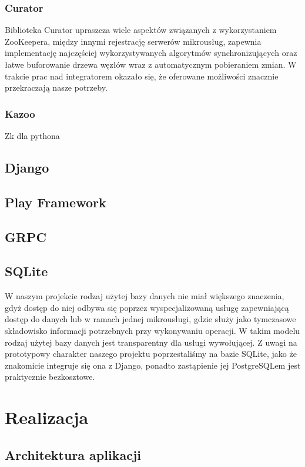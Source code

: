 \documentclass[licencjacka]{pracamgr}
\begin{document}
\subsection{Curator}
Biblioteka Curator upraszcza wiele aspektów związanych
z wykorzystaniem ZooKeepera, między innymi rejestrację serwerów mikrousług,
zapewnia implementację najczęściej wykorzystywanych algorytmów synchronizujących
oraz łatwe buforowanie drzewa węzłów wraz z automatycznym pobieraniem zmian. W
trakcie prac nad integratorem okazało się, że oferowane możliwości znacznie przekraczają
nasze potrzeby.

\subsection{Kazoo}
Zk dla pythona

\section{Django}

\section{Play Framework}

\section{GRPC}

\section{SQLite}

W naszym projekcie rodzaj użytej bazy danych nie miał większego znaczenia, gdyż
dostęp do niej odbywa się poprzez wyspecjalizowaną usługę zapewniającą dostęp do
danych lub w ramach jednej mikrousługi, gdzie służy jako tymczasowe składowisko
informacji potrzebnych przy wykonywaniu operacji. W takim modelu rodzaj użytej
bazy danych jest transparentny dla usługi wywołującej. Z uwagi na prototypowy
charakter naszego projektu poprzestaliśmy na bazie SQLite, jako że znakomicie
integruje się ona z Django, ponadto zastąpienie jej PostgreSQLem jest
praktycznie bezkosztowe.

\chapter{Realizacja}

\section{Architektura aplikacji}
\end{document}
